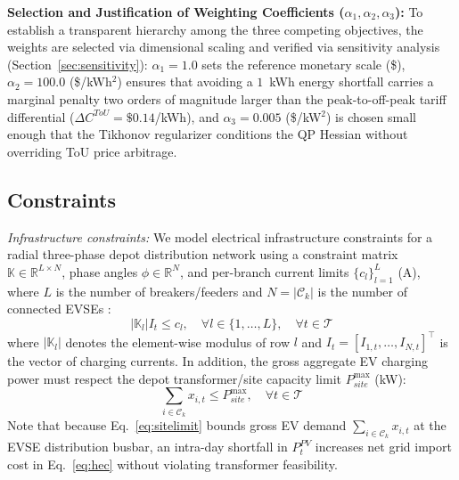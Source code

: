 \documentclass[final,3p,times,twocolumn]{elsarticle}
\begin{document}
\textbf{Selection and Justification of Weighting Coefficients ($\alpha_1, \alpha_2, \alpha_3$):} To establish a transparent hierarchy among the three competing objectives, the weights are selected via dimensional scaling and verified via sensitivity analysis (Section~\ref{sec:sensitivity}): $\alpha_1 = 1.0$ sets the reference monetary scale (\$), $\alpha_2 = 100.0$ (\$/kWh$^2$) ensures that avoiding a $1$~kWh energy shortfall carries a marginal penalty two orders of magnitude larger than the peak-to-off-peak tariff differential ($\Delta C^{ToU} = \$0.14$/kWh), and $\alpha_3 = 0.005$ (\$/kW$^2$) is chosen small enough that the Tikhonov regularizer conditions the QP Hessian without overriding ToU price arbitrage.

\subsection{Constraints}
\label{sec:constraints}

\textit{Infrastructure constraints:} We model electrical infrastructure constraints for a radial three-phase depot distribution network using a constraint matrix $\mathbb{K} \in \mathbb{R}^{L \times N}$, phase angles $\phi \in \mathbb{R}^N$, and per-branch current limits $\{c_l\}_{l=1}^L$ (A), where $L$ is the number of breakers/feeders and $N = |\mathcal{C}_k|$ is the number of connected EVSEs \cite{lee2019acnsim,lee2021adaptive,uddin2024charging}:
\begin{equation}
    |\mathbb{K}_l| I_t \le c_l, \quad \forall l \in \{1, \dots, L\}, \quad \forall t \in \mathcal{T}
    \label{eq:branch}
\end{equation}
where $|\mathbb{K}_l|$ denotes the element-wise modulus of row $l$ and $I_t = [I_{1,t}, \dots, I_{N,t}]^\top$ is the vector of charging currents. In addition, the gross aggregate EV charging power must respect the depot transformer/site capacity limit $P_{site}^{\max}$ (kW):
\begin{equation}
    \sum_{i \in \mathcal{C}_k} x_{i,t} \le P_{site}^{\max}, \quad \forall t \in \mathcal{T}
    \label{eq:sitelimit}
\end{equation}
Note that because Eq.~\eqref{eq:sitelimit} bounds gross EV demand $\sum_{i \in \mathcal{C}_k} x_{i,t}$ at the EVSE distribution busbar, an intra-day shortfall in $P_t^{PV}$ increases net grid import cost in Eq.~\eqref{eq:hec} without violating transformer feasibility.
\end{document}

